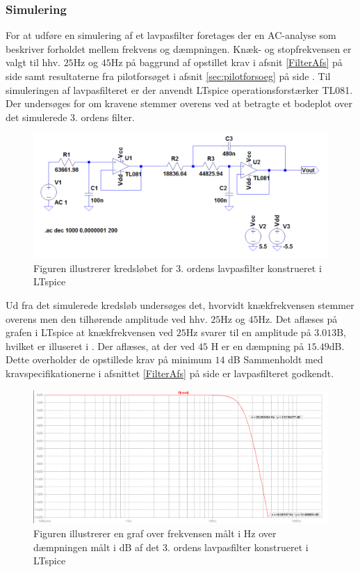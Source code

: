 \subsubsection{Simulering}
For at udføre en simulering af et lavpasfilter foretages der en AC-analyse som beskriver forholdet mellem frekvens og dæmpningen. Knæk- og stopfrekvensen er valgt til hhv. $25$Hz og $45$Hz på baggrund af opstillet krav i afsnit \ref{FilterAfs} på side \pageref{FilterAfs} samt resultaterne fra pilotforsøget i afsnit \ref{sec:pilotforsoeg} på side \pageref{sec:pilotforsoeg}. Til simuleringen af lavpasfilteret er der anvendt LTspice operationsforstærker TL081. Der undersøges for om kravene stemmer overens ved at betragte et bodeplot over det simulerede 3. ordens filter.

\begin{figure}[H]
	\centering
	\includegraphics[scale=0.45]{figures/cProblemloesning/Lavpasfilter_LTspice.PNG}
	\caption{Figuren illustrerer kredsløbet for 3. ordens lavpasfilter konstrueret i LTspice}
	\label{fig:lavpasfilter_LTspice}
\end{figure}

Ud fra det simulerede kredsløb undersøges det, hvorvidt knækfrekvensen stemmer overens men den tilhørende amplitude ved hhv. $25$Hz og $45$Hz. Det aflæses på grafen i LTspice at knækfrekvensen ved $25$Hz svarer til en amplitude på $3.01$3B, hvilket er illuseret i . Der aflæses, at der ved $45$ H er en dæmpning på $15.49$dB. Dette overholder de opstillede krav på minimum $14$ dB Sammenholdt med kravspecifikationerne i afsnittet \ref{FilterAfs} på side \pageref{FilterAfs} er lavpasfilteret godkendt.

\begin{figure}[H]
	\centering
	\includegraphics[scale=0.4]{figures/cProblemloesning/Lavpasfiltergraf_LTspice1.PNG}
	\caption{Figuren illustrerer en graf over frekvensen målt i Hz over dæmpningen målt i dB af det 3. ordens lavpasfilter konstrueret i LTspice}
	\label{fig:lavpasfilter_LTspice}
\end{figure}


